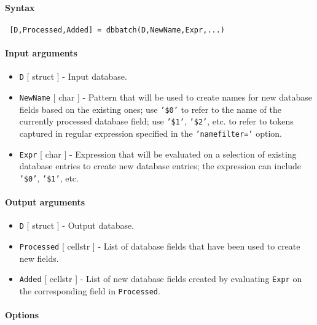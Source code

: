 


	\paragraph{Syntax}
 
 \begin{verbatim}
 [D,Processed,Added] = dbbatch(D,NewName,Expr,...)
 \end{verbatim}
 
 \paragraph{Input arguments}
 
 \begin{itemize}
 \item
   \texttt{D} {[} struct {]} - Input database.
 \item
   \texttt{NewName} {[} char {]} - Pattern that will be used to create
   names for new database fields based on the existing ones; use
   \texttt{'\$0'} to refer to the name of the currently processed
   database field; use \texttt{'\$1'}, \texttt{'\$2'}, etc. to refer to
   tokens captured in regular expression specified in the
   \texttt{'namefilter='} option.
 \item
   \texttt{Expr} {[} char {]} - Expression that will be evaluated on a
   selection of existing database entries to create new database entries;
   the expression can include \texttt{'\$0'}, \texttt{'\$1'}, etc.
 \end{itemize}
 
 \paragraph{Output arguments}
 
 \begin{itemize}
 \item
   \texttt{D} {[} struct {]} - Output database.
 \item
   \texttt{Processed} {[} cellstr {]} - List of database fields that have
   been used to create new fields.
 \item
   \texttt{Added} {[} cellstr {]} - List of new database fields created
   by evaluating \texttt{Expr} on the corresponding field in
   \texttt{Processed}.
 \end{itemize}
 
 \paragraph{Options}
 
